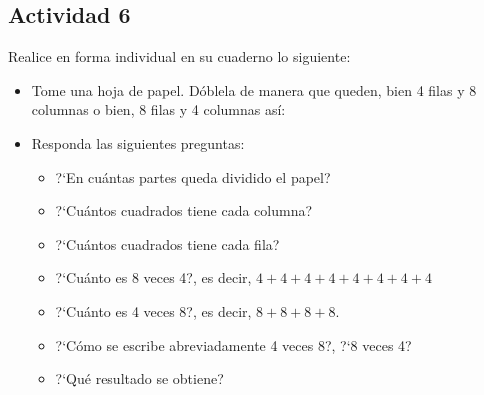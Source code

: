 \documentclass[10pt,twoside]{article}
\begin{document}
\subsection*{Actividad 6}
Realice en forma individual en su cuaderno lo siguiente:
\begin{itemize}
 \item Tome una hoja de papel. D\'oblela de manera que queden, bien 4 filas y 8 columnas o bien, 8 filas y 4 columnas as\'i:

\item Responda las siguientes preguntas:
\begin{itemize}
 \item ?`En cu\'antas partes queda dividido el papel?
\item ?`Cu\'antos cuadrados tiene cada columna?
\item ?`Cu\'antos cuadrados tiene cada fila?
\item ?`Cu\'anto es 8 veces 4?, es decir, $4+4+4+4+4+4+4+4$
\item ?`Cu\'anto es 4 veces 8?, es decir, $8+8+8+8$.
\item ?`C\'omo se escribe abreviadamente 4 veces 8?, ?`8 veces 4?
\item ?`Qu\'e resultado se obtiene?
\end{itemize}
\end{itemize}
\end{document}
